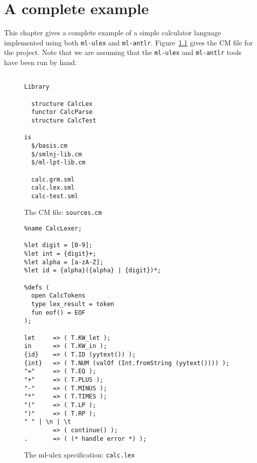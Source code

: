 %
\chapter{A complete example}
\label{ch:example}

This chapter gives a complete example of a simple calculator
language implemented using both \texttt{ml-ulex} and \texttt{ml-antlr}.
Figure~\ref{fig:calc-sources} gives the CM file for the project.
Note that we are assuming that the \texttt{ml-ulex} and \texttt{ml-antlr}
tools have been run by hand.
\begin{figure}[h]
\begin{verbatim}

Library

  structure CalcLex
  functor CalcParse
  structure CalcTest

is
  $/basis.cm
  $/smlnj-lib.cm
  $/ml-lpt-lib.cm

  calc.grm.sml
  calc.lex.sml
  calc-test.sml

\end{verbatim}
\caption{The CM file: {\tt sources.cm}}
\label{fig:calc-sources}
\end{figure}

\begin{figure}

\begin{verbatim}
%name CalcLexer;

%let digit = [0-9];
%let int = {digit}+;
%let alpha = [a-zA-Z];
%let id = {alpha}({alpha} | {digit})*;

%defs (
  open CalcTokens
  type lex_result = token
  fun eof() = EOF
);

let     => ( T.KW_let );
in      => ( T.KW_in );
{id}    => ( T.ID (yytext()) );
{int}   => ( T.NUM (valOf (Int.fromString (yytext()))) );
"="     => ( T.EQ );
"+"     => ( T.PLUS );
"-"     => ( T.MINUS );
"*"     => ( T.TIMES );
"("     => ( T.LP );
")"     => ( T.RP );
" " | \n | \t
        => ( continue() );
.       => ( (* handle error *) );
\end{verbatim}
\caption{The ml-ulex specification: {\tt calc.lex}}
\label{fig:calc-lex}
\end{figure}

